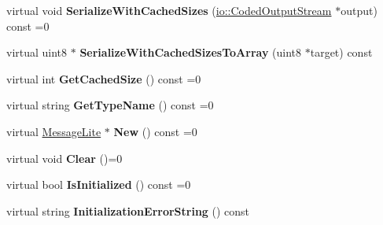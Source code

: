\begin{DoxyCompactItemize}
\mbox{\label{classgoogle_1_1protobuf_1_1MessageLite_acdb63663d2f0be89b34066bdf35de207}} 
virtual void {\bfseries Serialize\+With\+Cached\+Sizes} (\hyperlink{classgoogle_1_1protobuf_1_1io_1_1CodedOutputStream}{io\+::\+Coded\+Output\+Stream} $\ast$output) const =0
\item 
\mbox{\label{classgoogle_1_1protobuf_1_1MessageLite_a70e8bb138ee12a43c4ded832b1c71ddc}} 
virtual uint8 $\ast$ {\bfseries Serialize\+With\+Cached\+Sizes\+To\+Array} (uint8 $\ast$target) const
\item 
\mbox{\label{classgoogle_1_1protobuf_1_1MessageLite_a5347f639af70b2f2ba4963791931404e}} 
virtual int {\bfseries Get\+Cached\+Size} () const =0
\item 
\mbox{\label{classgoogle_1_1protobuf_1_1MessageLite_a9bc0ee1b979ef7d7906ff899913525e6}} 
virtual string {\bfseries Get\+Type\+Name} () const =0
\item 
\mbox{\label{classgoogle_1_1protobuf_1_1MessageLite_ac56f702622baf4bc8b5fe7ea6f66c6cc}} 
virtual \hyperlink{classgoogle_1_1protobuf_1_1MessageLite}{Message\+Lite} $\ast$ {\bfseries New} () const =0
\item 
\mbox{\label{classgoogle_1_1protobuf_1_1MessageLite_a76c6fc63bd2a7be4b9220cbf243b81fb}} 
virtual void {\bfseries Clear} ()=0
\item 
\mbox{\label{classgoogle_1_1protobuf_1_1MessageLite_af4482fa58b3ada0b35fd8e79b2bd0387}} 
virtual bool {\bfseries Is\+Initialized} () const =0
\item 
\mbox{\label{classgoogle_1_1protobuf_1_1MessageLite_aed101bcd0b42433d1de5654348d8f348}} 
virtual string {\bfseries Initialization\+Error\+String} () const
\item 
\mbox{\label{classgoogle_1_1protobuf_1_1MessageLite_a77c1e2ece518d215e3d8b3fe6830bcfb}} 

\end{DoxyCompactItemize}
